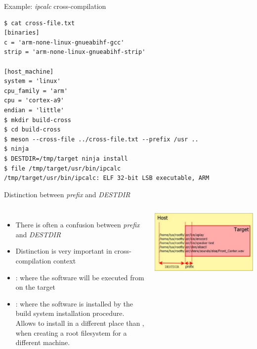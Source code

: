 \begin{frame}[fragile]{Example: {\em ipcalc} cross-compilation}
    \begin{block}{}
      {\footnotesize
\begin{verbatim}
$ cat cross-file.txt
[binaries]
c = 'arm-none-linux-gnueabihf-gcc'
strip = 'arm-none-linux-gnueabihf-strip'

[host_machine]
system = 'linux'
cpu_family = 'arm'
cpu = 'cortex-a9'
endian = 'little'
$ mkdir build-cross
$ cd build-cross
$ meson --cross-file ../cross-file.txt --prefix /usr ..
$ ninja
$ DESTDIR=/tmp/target ninja install
$ file /tmp/target/usr/bin/ipcalc
/tmp/target/usr/bin/ipcalc: ELF 32-bit LSB executable, ARM
\end{verbatim}
      }
    \end{block}
\end{frame}

\begin{frame}{Distinction between {\em prefix} and {\em DESTDIR}}
  \begin{columns}
    \begin{itemize}
    \item There is often a confusion between {\em prefix} and {\em
        DESTDIR}
    \item Distinction is very important in cross-compilation context
    \item {}: where the software will be executed from on the
      target
    \item {}: where the software is installed by the build
      system installation procedure. Allows to install in a different
      place than , when creating a root filesystem for a
      different machine.
    \end{itemize}
    \includegraphics[width=\textwidth]{slides/sysdev-cross-compiling-user-space/destdir-and-prefix.pdf}
  \end{columns}
\end{frame}

